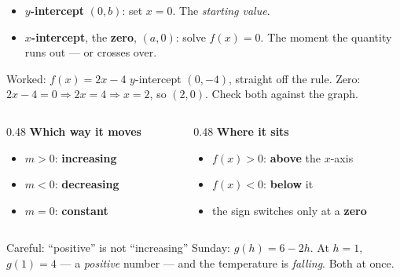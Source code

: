\documentclass[aspectratio=169, 11pt]{beamer}
\begin{document}
\begin{frame}[t, plain]
  \begin{itemize}\setlength{\itemsep}{6pt}
    \item \textbf{$y$-intercept} $(0,b)$: set $x=0$. \; The \emph{starting value}.
    \item \textbf{$x$-intercept}, the \textbf{zero}, $(a,0)$: solve $f(x)=0$. \; The moment the
          quantity runs out --- or crosses over.
  \end{itemize}
  \vspace{4pt}
  \begin{block}{Worked: $f(x)=2x-4$}
    $y$-intercept $(0,-4)$, straight off the rule. \; Zero: $2x-4=0 \Rightarrow 2x=4 \Rightarrow x=2$,
    so $(2,0)$. Check both against the graph.
  \end{block}
\end{frame}

\begin{frame}[t, plain]
  \begin{columns}[T]
    \begin{column}{0.48\textwidth}
      \textbf{Which way it moves}
      \begin{itemize}\setlength{\itemsep}{3pt}
        \item $m>0$: \textbf{increasing}
        \item $m<0$: \textbf{decreasing}
        \item $m=0$: \textbf{constant}
      \end{itemize}
    \end{column}
    \begin{column}{0.48\textwidth}
      \textbf{Where it sits}
      \begin{itemize}\setlength{\itemsep}{3pt}
        \item $f(x)>0$: \textbf{above} the $x$-axis
        \item $f(x)<0$: \textbf{below} it
        \item the sign switches only at a \textbf{zero}
      \end{itemize}
    \end{column}
  \end{columns}
  \vspace{6pt}
  \begin{block}{Careful: ``positive'' is not ``increasing''}
    Sunday: $g(h)=6-2h$. At $h=1$, $g(1)=4$ --- a \emph{positive} number --- and the temperature is
    \emph{falling}. Both at once.
  \end{block}
\end{frame}
\end{document}

